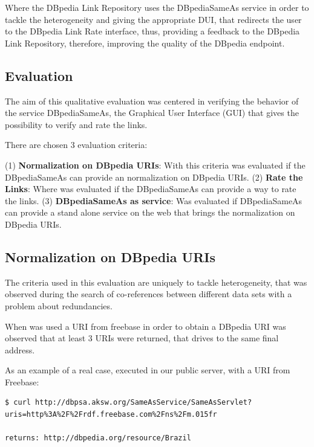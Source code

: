 Where the DBpedia Link Repository uses the DBpediaSameAs service in order to tackle the heterogeneity and giving the appropriate DUI, that redirects the user to the DBpedia Link Rate interface, thus, providing a feedback to the DBpedia Link Repository, therefore, improving the quality of the DBpedia endpoint.

\subsection{Evaluation}\label{ev:dbpediasameas}

The aim of this qualitative evaluation was centered in verifying the behavior of the service DBpediaSameAs, the Graphical User Interface (GUI) that gives the possibility to verify and rate the links.

There are chosen 3 evaluation criteria:

(1) \textbf{Normalization on DBpedia URIs}: With this criteria was evaluated if the DBpediaSameAs can provide an normalization on DBpedia URIs.
(2) \textbf{Rate the Links}: Where was evaluated if the DBpediaSameAs can provide a way to rate the links.
(3) \textbf{DBpediaSameAs as service}: Was evaluated if DBpediaSameAs can provide a stand alone service on the web that brings the normalization on DBpedia URIs.

\subsection{Normalization on DBpedia URIs}
The criteria used in this evaluation are uniquely to tackle heterogeneity, that was observed during the search of co-references between different data sets with a problem about redundancies.

When was used a URI from freebase in order to obtain a DBpedia URI was observed that at least 3 URIs were returned, that drives to the same final address.

As an example of a real case, executed in our public server, with a URI from Freebase:

\begin{lstlisting}
$ curl http://dbpsa.aksw.org/SameAsService/SameAsServlet?uris=http%3A%2F%2Frdf.freebase.com%2Fns%2Fm.015fr

returns: http://dbpedia.org/resource/Brazil
\end{lstlisting}


